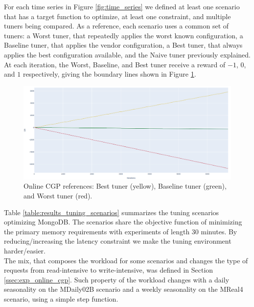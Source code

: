 \documentclass[a4paper, 12pt]{article} %
\begin{document}
	For each time series in Figure \ref{fig:time_series} we defined at least one scenario that has a target function to optimize, at least one constraint, and multiple tuners being compared. As a reference, each scenario uses a common set of tuners: a Worst tuner, that repeatedly applies the worst known configuration, a Baseline tuner, that applies the vendor configuration, a Best tuner, that always applies the best configuration available, and the Naive tuner previously explained.\\
	At each iteration, the Worst, Baseline, and Best tuner receive a reward of $-1$, $0$, and $1$ respectively, giving the boundary lines shown in Figure \ref{fig:results_onlinecgp_references}.
	
	\begin{figure} \centering
		\includegraphics[width=4.5in]{img/results_onlinecgp_references.png}
		\caption{Online CGP references: Best tuner (yellow), Baseline tuner (green), and Worst tuner (red).}
		\label{fig:results_onlinecgp_references}
	\end{figure}
	
	
	Table \ref{table:results_tuning_scenarios} summarizes the tuning scenarios optimizing MongoDB. The scenarios share the objective function of minimizing the primary memory requirements with experiments of length 30 minutes. By reducing/increasing the latency constraint we make the tuning environment harder/easier. \\
	The mix, that composes the workload for some scenarios and changes the type of requests from read-intensive to write-intensive, was defined in Section \ref{ssec:exp_online_cgp}.
	Such property of the workload changes with a daily seasonality on the MDaily02B scenario and a weekly seasonality on the MReal4 scenario, using a simple step function. 
	
\end{document}
